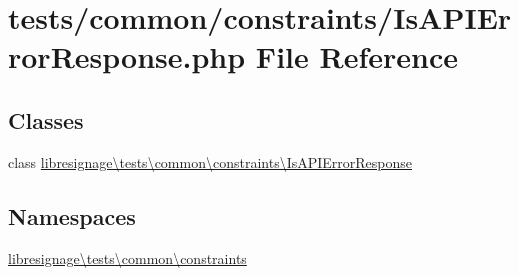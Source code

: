 \hypertarget{IsAPIErrorResponse_8php}{}\section{tests/common/constraints/\+Is\+A\+P\+I\+Error\+Response.php File Reference}
\label{IsAPIErrorResponse_8php}
\subsection*{Classes}
\begin{DoxyCompactItemize}
\item 
class \hyperlink{classlibresignage_1_1tests_1_1common_1_1constraints_1_1IsAPIErrorResponse}{libresignage\textbackslash{}tests\textbackslash{}common\textbackslash{}constraints\textbackslash{}\+Is\+A\+P\+I\+Error\+Response}
\end{DoxyCompactItemize}
\subsection*{Namespaces}
\begin{DoxyCompactItemize}
\item 
 \hyperlink{namespacelibresignage_1_1tests_1_1common_1_1constraints}{libresignage\textbackslash{}tests\textbackslash{}common\textbackslash{}constraints}
\end{DoxyCompactItemize}

